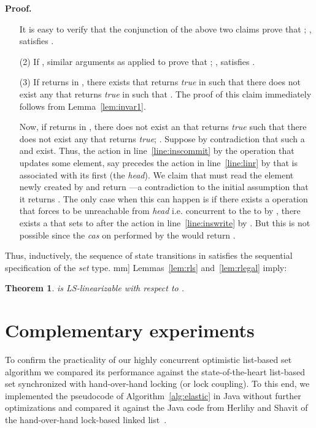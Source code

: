 \documentclass[11pt,pdftex,letterpaper]{article}
\newtheorem{theorem}{Theorem}
\newenvironment{proof}[1][Proof]{\noindent\textbf{#1.} }{\hfill \2mm]}
\newcommand{\LS}{LS}
\begin{document}
\begin{proof}
\begin{enumerate}
It is easy to verify that the conjunction of the above two claims prove that ; ,  satisfies .
\item[(2)]
If , similar arguments as applied to  prove that ; ,  satisfies .

\item[(3)]
If  returns  in , there exists  that returns \emph{true} in  such that there does not exist any  that returns \emph{true} in  such that .
The proof of this claim immediately follows from Lemma~\ref{lem:invar1}.


Now, if  returns  in , 
there does not exist an  that returns \emph{true} such that 
there does not exist any  that returns \emph{true}; 
.
Suppose by contradiction that such a  and  exist. 
Thus, the action in line~\ref{line:inscommit} by the  operation that updates some element, 
say  precedes the action in line~\ref{line:linr} by  that is associated with its 
first  (the \emph{head}).
We claim that  must read the element  newly created by
 and return ---a contradiction to the initial assumption that it returns .
The only case when this can happen is if there exists a 
operation that forces  to be unreachable from \emph{head} i.e. concurrent to the 
to  by , there exists a  that sets  to 
after the action in line~\ref{line:inswrite} by .
But this is not possible since the \emph{cas} on  performed by the 
would return .
\end{enumerate}
Thus, inductively, the sequence of state transitions in 
satisfies the sequential specification of the \textit{set} type. 
\end{proof}
Lemmas~\ref{lem:rls} and~\ref{lem:rlegal} imply:
\begin{theorem}
\label{th:lr}
 is \LS-linearizable with respect to .
\end{theorem}






\section{Complementary experiments}\label{sec:expe}
To confirm the practicality of our highly concurrent optimistic list-based set algorithm we compared its performance against the state-of-the-heart list-based set synchronized with hand-over-hand locking (or lock coupling).
To this end, we implemented the pseudocode of Algorithm~\ref{alg:elastic} in Java without further optimizations and compared it against the Java code from Herlihy and 
Shavit of the hand-over-hand lock-based linked list~\cite{HS08-book}. 
\end{document}
